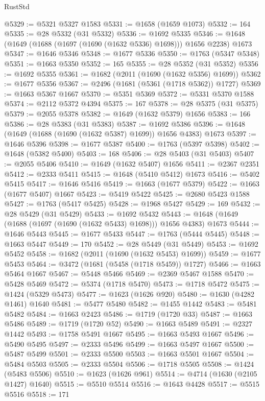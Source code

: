 \begin{lexlean}{RustStd}
\begin{coremodule}
@5329 := @5321 @5327 @1583
@5331 := @1658 (@1659 @1073)
@5332 := 164
@5335 := @28 @5332 (@31 @5332)
@5336 := @1692 @5335
@5346 := @1648 (@1649 (@1688 (@1697 (@1690 (@1632 @5336) @1698))) @1656 @2238) @1673
@5347 := @1646 @5346
@5348 := @1677 @5336
@5350 := @1763 (@5347 @5348)
@5351 := @1663 @5350
@5352 := 165
@5355 := @28 @5352 (@31 @5352)
@5356 := @1692 @5355
@5361 := @1682 (@2011 (@1690 (@1632 @5356) @1699))
@5362 := @1677 @5356
@5367 := @2496 (@1681 (@5361 (@1718 @5362)) @1727)
@5369 := @1663 @5367 @1667
@5370 := @5351 @5369
@5372 := @5331 @5370 @1588
@5374 := @2112 @5372 @4394
@5375 := 167
@5378 := @28 @5375 (@31 @5375)
@5379 := @2055 @5378
@5382 := @1649 (@1632 @5379) @1656
@5383 := 166
@5386 := @28 @5383 (@31 @5383)
@5387 := @1692 @5386
@5396 := @1648 (@1649 (@1688 (@1690 (@1632 @5387) @1699)) @1656 @4383) @1673
@5397 := @1646 @5396
@5398 := @1677 @5387
@5400 := @1763 (@5397 @5398)
@5402 := @1648 (@5382 @5400)
@5403 := 168
@5406 := @28 @5403 (@31 @5403)
@5407 := @2055 @5406
@5410 := @1649 (@1632 @5407) @1656
@5411 := @2367 @2351
@5412 := @2333 @5411
@5415 := @1648 (@5410 @5412) @1673
@5416 := @5402 @5415
@5417 := @1646 @5416
@5419 := @1663 (@1677 @5379)
@5422 := @1663 (@1677 @5407) @1667
@5423 := @5419 @5422
@5425 := @2680 @5423 @1588
@5427 := @1763 (@5417 @5425)
@5428 := @1968 @5427
@5429 := 169
@5432 := @28 @5429 (@31 @5429)
@5433 := @1692 @5432
@5443 := @1648 (@1649 (@1688 (@1697 (@1690 (@1632 @5433) @1698))) @1656 @4383) @1673
@5444 := @1646 @5443
@5445 := @1677 @5433
@5447 := @1763 (@5444 @5445)
@5448 := @1663 @5447
@5449 := 170
@5452 := @28 @5449 (@31 @5449)
@5453 := @1692 @5452
@5458 := @1682 (@2011 (@1690 (@1632 @5453) @1699))
@5459 := @1677 @5453
@5464 := @3472 (@1681 (@5458 (@1718 @5459)) @1727)
@5466 := @1663 @5464 @1667
@5467 := @5448 @5466
@5469 := @2369 @5467 @1588
@5470 := @5428 @5469
@5472 := @5374 (@1718 @5470)
@5473 := @1718 @5472
@5475 := @1424 (@5329 @5473)
@5477 := @1623 (@1626 @920)
@5480 := @1630 (@4282 @1461) @1640
@5481 := @5477 @5480
@5482 := @1455 @1442
@5483 := @5481 @5482
@5484 := @1663 @2423
@5486 := @1719 (@1720 @33)
@5487 := @1663 @5486
@5489 := @1719 (@1720 @52)
@5490 := @1663 @5489
@5491 := @2327 @1442
@5493 := @1758 @5491 @1667
@5495 := @1663 @5493 @1667
@5496 := @5490 @5495
@5497 := @2333 @5496
@5499 := @1663 @5497 @1667
@5500 := @5487 @5499
@5501 := @2333 @5500
@5503 := @1663 @5501 @1667
@5504 := @5484 @5503
@5505 := @2333 @5504
@5506 := @1718 @5505
@5508 := @1424 (@5483 @5506)
@5510 := @1623 (@1626 @961)
@5514 := @4714 (@1630 (@2105 @1427) @1640)
@5515 := @5510 @5514
@5516 := @1643 @4428
@5517 := @5515 @5516
@5518 := 171

\end{coremodule}
\end{lexlean}
